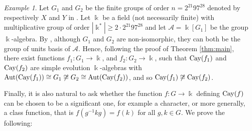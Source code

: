 \documentclass[a4paper,12pt]{amsart}
\theoremstyle{definition}
\theoremstyle{remark}
\newtheorem{example}[theorem]{Example}
\newcommand{\Aut}{\operatorname{Aut}}
\newcommand{\Cay}{{\rm Cay}}
\newcommand{\A}{\mathcal{A}}
\begin{document}
\begin{example}\label{ex:hertwek}
Let $G_1$ and $G_2$ be the finite groups of order $n=2^{21}97^{28}$ denoted by  respectively $X$ and $Y$ in \cite[Theorem B]{Hert}. Let $\Bbbk$ be a field (not necessarily finite) with multiplicative group of order $|\Bbbk^*| \geq 2 \cdot 2^{21}97^{28}$ and let
 $\A= \Bbbk[G_1]$ be the group $\Bbbk$-algebra.  By \cite[Theorem B]{Hert},  although $G_1$ and $G_2$  are non-isomorphic, they can both be the group of units basis of $\A$. Hence, following the proof of Theorem \ref{thm:main},  there exist functions $f_1\colon G_1\to \Bbbk$,  and $f_2\colon G_2\to \Bbbk$, such that $\Cay(f_1)$ and  $\Cay(f_2)$ are simple evolution $\Bbbk$-algebras with  $\Aut(\Cay(f_1))\cong G_1 \not \cong G_2 \cong \Aut(\Cay(f_2))$, and so $\Cay(f_1) \not \cong \Cay(f_2)$.  
\end{example}

Finally, it is also natural to ask whether the function $f\colon G\to \Bbbk$ defining $\Cay(f)$ can be chosen to be a significant one, for example a character, or more generally, a  class function, that is $f(g^{-1}kg)=f(k)$ for all $g,k\in G$. We prove the following:
\end{document}
